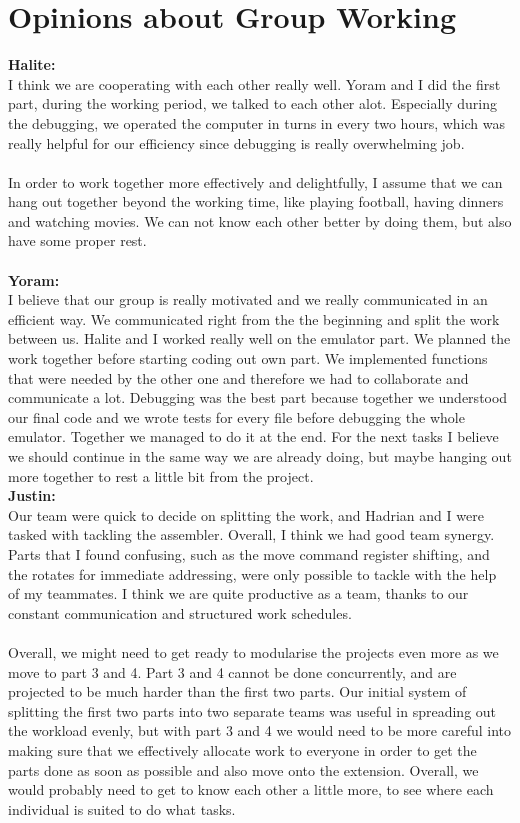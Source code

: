 \documentclass[a4paper]{article}
\begin{document}
\section{Opinions about Group Working}
\textbf{Halite:}\\
I think we are cooperating with each other really well. Yoram and I did the first part, during the working period, we talked to each other alot. Especially during the debugging, we operated the computer in turns in every two hours, which was really helpful for our efficiency since debugging is really overwhelming job.\\\\
In order to work together more effectively and delightfully, I assume that we can hang out together beyond the working time, like playing football, having dinners and watching movies. We can not know each other better by doing them, but also have some proper rest.\\
\\
\textbf{Yoram:}\\
I believe that our group is really motivated and we really communicated in an efficient way. We communicated right from the the beginning and split the work between us.
Halite and I worked really well on the emulator part. We planned the work together before starting coding out own part. We implemented functions that were needed by the other one and therefore we had to collaborate and communicate a lot.
Debugging was the best part because together we understood our final code and we wrote tests for every file before debugging the whole emulator. Together we managed to do it at the end.
For the next tasks I believe we should continue in the same way we are already doing, but maybe hanging out more together to rest a little bit from the project.
\\
\textbf{Justin:}\\
Our team were quick to decide on splitting the work, and Hadrian and I were tasked with tackling the assembler. Overall, I think we had good team synergy. Parts that I found confusing, such as the move command register shifting, and the rotates for immediate addressing, were only possible to tackle with the help of my teammates. I think we are quite productive as a team, thanks to our constant communication and structured work schedules.
\\\\
Overall, we might need to get ready to modularise the projects even more as we move to part 3 and 4. Part 3 and 4 cannot be done concurrently, and are projected to be much harder than the first two parts. Our initial system of splitting the first two parts into two separate teams was useful in spreading out the workload evenly, but with part 3 and 4 we would need to be more careful into making sure that we effectively allocate work to everyone in order to get the parts done as soon as possible and also move onto the extension. Overall, we would probably need to get to know each other a little more, to see where each individual is suited to do what tasks.\\
\end{document}

